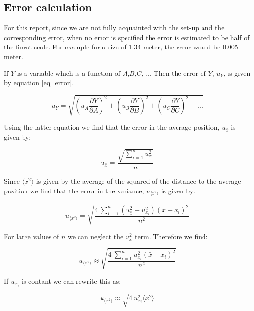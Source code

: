\subsection{Error calculation}

For this report, since we are not fully acquainted with the set-up and the corresponding error, when no error is specified the error is estimated to be half of the finest scale. For example for a size of 1.34 meter, the error would be 0.005 meter.

If $Y$ is a variable which is a function of $A$,$B$,$C$, ... Then the error of $Y$, $u_Y$, is given by equation \ref{eq_error}.

\begin{equation}
	\label{eq_error}
	u_Y = \sqrt{\left(u_A \frac{\partial Y}{\partial A}\right)^2 + \left(u_B \frac{\partial Y}{\partial B}\right)^2 + \left(u_C \frac{\partial Y}{\partial C}\right)^2 + ...}
\end{equation}

Using the latter equation we find that the error in the average position, $u_{\bar{x}}$ is given by:

\begin{equation}
	\label{eq_u_mean}
	u_{\bar{x}} =  \frac{ \sqrt{ \sum_{i=1}^n u_{x_i}^2}}{n} 
\end{equation}

Since $ \langle x^2 \rangle $ is given by the average of the squared of the distance to the average position we find that the error in the variance, $u_{ \langle x^2 \rangle } $ is given by:

\begin{equation}
	\label{eq_u_var}
	u_{ \langle x^2 \rangle }=  \sqrt{ \frac{ 4 \: \sum_{i=1}^n    \left( u_{\bar{x}}^2 + u_{x_i}^2 \right) \left( \bar{x} - x_i \right)^2}{n^2}} 
\end{equation}

For large values of $n$ we can neglect the $ u_{\bar{x}}^2$ term. Therefore we find:

\begin{equation}
	\label{eq_u_var_approx}
	u_{ \langle x^2 \rangle } \approx  \sqrt{ \frac{ 4 \: \sum_{i=1}^n    u_{x_i}^2  \left( \bar{x} - x_i \right)^2}{n^2}} 
\end{equation}

If $ u_{x_i}$ is contant we can rewrite this as:

\begin{equation}
	\label{eq_u_var_constant}
	u_{ \langle x^2 \rangle } \approx  \sqrt{  4 \:     u_{x_i}^2  \langle x^2 \rangle } 
\end{equation}

